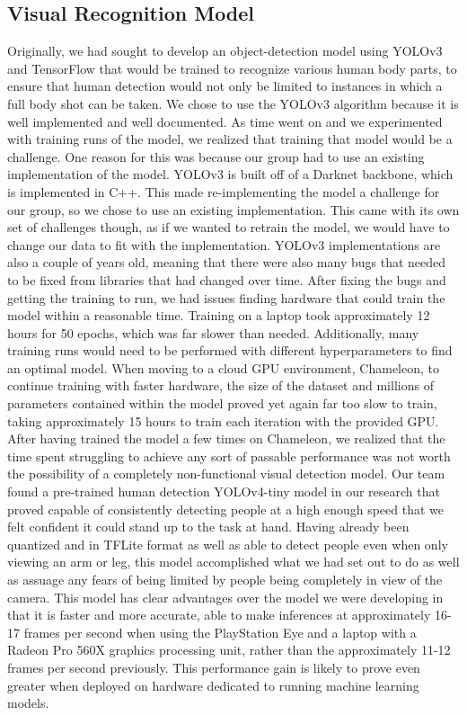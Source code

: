 \documentclass{article}
\begin{document}
\subsection{Visual Recognition Model}
Originally, we had sought to develop an object-detection model using YOLOv3 and TensorFlow that would be trained to recognize various human body parts, to ensure that human detection would not only be limited to instances in which a full body shot can be taken. We chose to use the YOLOv3 algorithm because it is well implemented and well documented. As time went on and we experimented with training runs of the model, we realized that training that model would be a challenge. One reason for this was because our group had to use an existing implementation of the model. YOLOv3 is built off of a Darknet backbone, which is implemented in C++. This made re-implementing the model a challenge for our group, so we chose to use an existing implementation. This came with its own set of challenges though, as if we wanted to retrain the model, we would have to change our data to fit with the implementation. YOLOv3 implementations are also a couple of years old, meaning that there were also many bugs that needed to be fixed from libraries that had changed over time. After fixing the bugs and getting the training to run, we had issues finding hardware that could train the model within a reasonable time. Training on a laptop took approximately 12 hours for 50 epochs, which was far slower than needed. Additionally, many training runs would need to be performed with different hyperparameters to find an optimal model. When moving to a cloud GPU environment, Chameleon, to continue training with faster hardware, the size of the dataset and millions of parameters contained within the model proved yet again far too slow to train, taking approximately 15 hours to train each iteration with the provided GPU. After having trained the model a few times on Chameleon, we realized that the time spent struggling to achieve any sort of passable performance was not worth the possibility of a completely non-functional visual detection model. Our team found a pre-trained human detection YOLOv4-tiny model in our research \cite{6} that proved capable of consistently detecting people at a high enough speed that we felt confident it could stand up to the task at hand. Having already been quantized and in TFLite format as well as able to detect people even when only viewing an arm or leg, this model accomplished what we had set out to do as well as assuage any fears of being limited by people being completely in view of the camera. This model has clear advantages over the model we were developing in that it is faster and more accurate, able to make inferences at approximately 16-17 frames per second when using the PlayStation Eye and a laptop with a Radeon Pro 560X graphics processing unit, rather than the approximately 11-12 frames per second previously. This performance gain is likely to prove even greater when deployed on hardware dedicated to running machine learning models.
\end{document}
